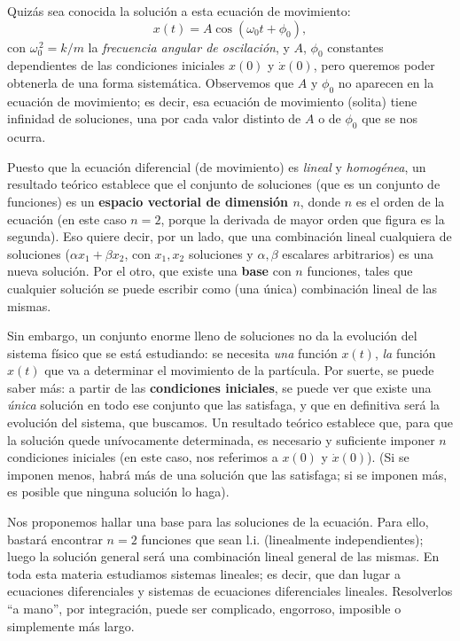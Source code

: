 \documentclass[a4paper,spanish]{article}
\numberwithin{equation}{section}
\begin{document}
Quiz\'as sea conocida la soluci\'on a esta ecuaci\'on de movimiento: 
    \begin{equation*}
        x(t) = A \cos(\omega_0 t + \phi_0),
    \end{equation*}
con $\omega_0^{\,2}=k/m$ la \textit{frecuencia angular de oscilaci\'on}, y $A$, $\phi_0$ constantes dependientes de las condiciones iniciales $x(0)$ y $\dot{x}(0)$, pero queremos poder obtenerla de una forma sistem\'atica. Observemos que $A$ y $\phi_0$ no aparecen en la ecuaci\'on de movimiento; es decir, esa ecuaci\'on de movimiento (solita) tiene infinidad de soluciones, una por cada valor distinto de $A$ o de $\phi_0$ que se nos ocurra.

Puesto que la ecuaci\'on diferencial (de movimiento) es \textit{lineal} y \textit{homog\'enea}, un resultado te\'orico establece que el conjunto de soluciones (que es un conjunto de funciones) es un \textbf{espacio vectorial de dimensi\'on $n$}, donde $n$ es el orden de la ecuaci\'on (en este caso $n=2$, porque la derivada de mayor orden que figura es la segunda). Eso quiere decir, por un lado, que una combinaci\'on lineal cualquiera de soluciones ($\alpha x_1 + \beta x_2$, con $x_1,x_2$ soluciones y $\alpha,\beta$ escalares arbitrarios) es una nueva soluci\'on. Por el otro, que existe una \textbf{base} con $n$ funciones, tales que cualquier soluci\'on se puede escribir como (una \'unica) combinaci\'on lineal de las mismas.

Sin embargo, un conjunto enorme lleno de soluciones no da la evoluci\'on del sistema f\'isico que se est\'a estudiando: se necesita \textit{una} funci\'on $x(t)$, \textit{la} funci\'on $x(t)$ que va a determinar el movimiento de la part\'icula. Por suerte, se puede saber m\'as: a partir de las \textbf{condiciones iniciales}, se puede ver que existe una \textit{\'unica} soluci\'on en todo ese conjunto que las satisfaga, y que en definitiva ser\'a la evoluci\'on del sistema, que buscamos. Un resultado te\'orico establece que, para que la soluci\'on quede un\'ivocamente determinada, es necesario y suficiente imponer $n$ condiciones iniciales (en este caso, nos referimos a $x(0)$ y $\dot{x}(0)$). (Si se imponen menos, habr\'a m\'as de una soluci\'on que las satisfaga; si se imponen m\'as, es posible que ninguna soluci\'on lo haga).

Nos proponemos hallar una base para las soluciones de la ecuaci\'on. Para ello, bastar\'a encontrar $n=2$ funciones que sean l.i. (linealmente independientes); luego la soluci\'on general ser\'a una combinaci\'on lineal general de las mismas. En toda esta materia estudiamos sistemas lineales; es decir, que dan lugar a ecuaciones diferenciales y sistemas de ecuaciones diferenciales lineales. Resolverlos ``a mano'', por integraci\'on, puede ser complicado, engorroso, imposible o simplemente m\'as largo. 
\end{document}
